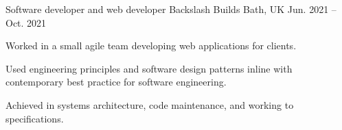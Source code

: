\begin{cventries}

\cventry
{Software developer and web developer} %
{Backslash Builds} %
{Bath, UK} %
{Jun. 2021 -- Oct. 2021} %
{ %
\begin{cvitems}
\item {Worked in a small agile team developing web applications for clients.}
\item {Used engineering principles and software design patterns inline with contemporary best practice for software engineering.}
\item {Achieved in systems architecture, code maintenance, and working to specifications.}
\end{cvitems}
}

\end{cventries}
